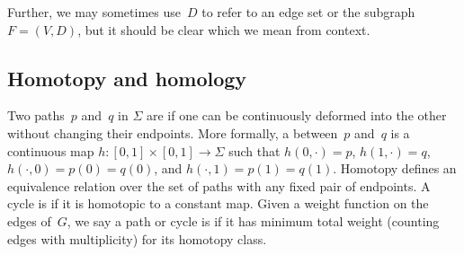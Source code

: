 \documentclass[11pt,twoside]{article}
\def\arcto{\mathord\shortrightarrow}
\begin{document}
Further, we may sometimes use~$D$ to refer to an edge set or the subgraph~$F = (V, D)$,
but it should be clear which we mean from context.



\subsection{Homotopy and homology}
\label{SS:homology}

Two paths~$p$ and~$q$ in $\Sigma$ are  if one can be
continuously deformed into the other without changing their endpoints.
More formally, a  between~$p$ and~$q$ is a
continuous map $h\colon {[0,1]\times [0,1] \to \Sigma}$ such that $h(0,\cdot) = p$, $h(1,\cdot) = q$, $h(\cdot, 0)=p(0)=q(0)$, and $h(\cdot,1)=p(1)=q(1)$.
Homotopy defines an equivalence relation over the set of paths with any
fixed pair of endpoints. 
%
%
A cycle is  if it is homotopic to a constant map.
Given a weight function on the edges of~$G$, we say a  path or cycle is  if it has minimum total weight (counting edges with multiplicity) for its homotopy class.
\end{document}
